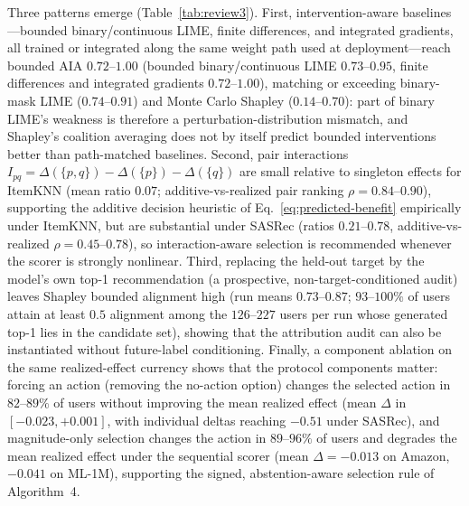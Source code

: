 \documentclass[a4paper,fleqn,doubleblind]{cas-sc}
\begin{document}
Three patterns emerge (Table~\ref{tab:review3}). First, intervention-aware baselines---bounded binary/continuous LIME, finite differences, and integrated gradients, all trained or integrated along the same weight path used at deployment---reach bounded AIA $0.72$--$1.00$ (bounded binary/continuous LIME $0.73$--$0.95$, finite differences and integrated gradients $0.72$--$1.00$), matching or exceeding binary-mask LIME ($0.74$--$0.91$) and Monte Carlo Shapley ($0.14$--$0.70$): part of binary LIME's weakness is therefore a perturbation-distribution mismatch, and Shapley's coalition averaging does not by itself predict bounded interventions better than path-matched baselines. Second, pair interactions $I_{pq}=\Delta(\{p,q\})-\Delta(\{p\})-\Delta(\{q\})$ are small relative to singleton effects for ItemKNN (mean ratio $0.07$; additive-vs-realized pair ranking $\rho=0.84$--$0.90$), supporting the additive decision heuristic of Eq.~\eqref{eq:predicted-benefit} empirically under ItemKNN, but are substantial under SASRec (ratios $0.21$--$0.78$, additive-vs-realized $\rho=0.45$--$0.78$), so interaction-aware selection is recommended whenever the scorer is strongly nonlinear. Third, replacing the held-out target by the model's own top-1 recommendation (a prospective, non-target-conditioned audit) leaves Shapley bounded alignment high (run means $0.73$--$0.87$; $93$--$100\%$ of users attain at least $0.5$ alignment among the $126$--$227$ users per run whose generated top-1 lies in the candidate set), showing that the attribution audit can also be instantiated without future-label conditioning. Finally, a component ablation on the same realized-effect currency shows that the protocol components matter: forcing an action (removing the no-action option) changes the selected action in $82$--$89\%$ of users without improving the mean realized effect (mean $\Delta$ in $[-0.023,+0.001]$, with individual deltas reaching $-0.51$ under SASRec), and magnitude-only selection changes the action in $89$--$96\%$ of users and degrades the mean realized effect under the sequential scorer (mean $\Delta=-0.013$ on Amazon, $-0.041$ on ML-1M), supporting the signed, abstention-aware selection rule of Algorithm~4.
\end{document}
